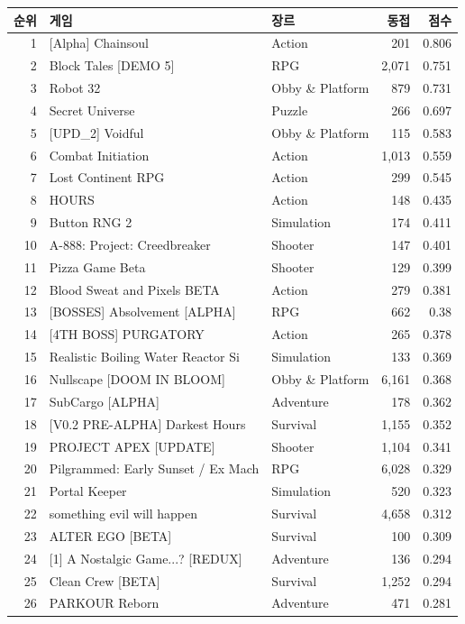 \documentclass[10pt]{article}
\begin{document}
\begin{longtable}{r l l r r}
\toprule
순위 & 게임 & 장르 & 동접 & 점수 \\
\midrule
\endhead
1 & [Alpha] Chainsoul & Action & 201 & 0.806 \\
2 & Block Tales [DEMO 5] & RPG & 2,071 & 0.751 \\
3 & Robot 32 & Obby \& Platform & 879 & 0.731 \\
4 & Secret Universe & Puzzle & 266 & 0.697 \\
5 & [UPD\_2] Voidful & Obby \& Platform & 115 & 0.583 \\
6 & Combat Initiation & Action & 1,013 & 0.559 \\
7 & Lost Continent RPG & Action & 299 & 0.545 \\
8 & HOURS & Action & 148 & 0.435 \\
9 & Button RNG 2 & Simulation & 174 & 0.411 \\
10 & A-888: Project: Creedbreaker & Shooter & 147 & 0.401 \\
11 & Pizza Game Beta & Shooter & 129 & 0.399 \\
12 & Blood Sweat and Pixels BETA & Action & 279 & 0.381 \\
13 & [BOSSES] Absolvement [ALPHA] & RPG & 662 & 0.38 \\
14 & [4TH BOSS] PURGATORY & Action & 265 & 0.378 \\
15 & Realistic Boiling Water Reactor Si & Simulation & 133 & 0.369 \\
16 & Nullscape [DOOM IN BLOOM] & Obby \& Platform & 6,161 & 0.368 \\
17 & SubCargo [ALPHA] & Adventure & 178 & 0.362 \\
18 & [V0.2 PRE-ALPHA] Darkest Hours & Survival & 1,155 & 0.352 \\
19 & PROJECT APEX [UPDATE] & Shooter & 1,104 & 0.341 \\
20 & Pilgrammed: Early Sunset / Ex Mach & RPG & 6,028 & 0.329 \\
21 & Portal Keeper & Simulation & 520 & 0.323 \\
22 & something evil will happen & Survival & 4,658 & 0.312 \\
23 & ALTER EGO [BETA] & Survival & 100 & 0.309 \\
24 & [1] A Nostalgic Game...? [REDUX] & Adventure & 136 & 0.294 \\
25 & Clean Crew  [BETA] & Survival & 1,252 & 0.294 \\
26 & PARKOUR Reborn & Adventure & 471 & 0.281 \\

\end{longtable}
\end{document}
